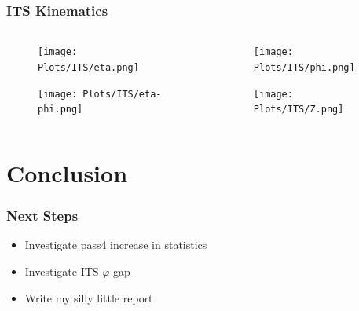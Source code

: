 \documentclass[11pt]{beamer}
\begin{document}
\begin{frame}
    \frametitle{ITS Kinematics}

    \begin{columns}[c]
        \begin{column}{0.5\textwidth}
            \begin{figure}
                \begin{center}
                    \texttt{[image: Plots/ITS/eta.png]}
                \end{center}
            \end{figure}
            \begin{figure}
                \begin{center}
                    \texttt{[image: Plots/ITS/eta-phi.png]}
                \end{center}
            \end{figure}
        \end{column}

        \begin{column}{0.5\textwidth}
            \begin{figure}
                \begin{center}
                    \texttt{[image: Plots/ITS/phi.png]}
                \end{center}
            \end{figure}
            \begin{figure}
                \begin{center}
                    \texttt{[image: Plots/ITS/Z.png]}
                \end{center}
            \end{figure}
        \end{column}
    \end{columns}

\end{frame}

\section{Conclusion}

\begin{frame}
    \frametitle{Next Steps}

    \begin{itemize}
        \item Investigate pass4 increase in statistics
        \item Investigate ITS $\varphi$ gap
        \item Write my silly little report
    \end{itemize}

\end{frame}
\end{document}
